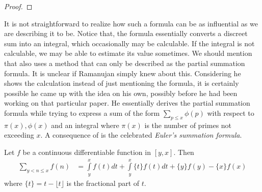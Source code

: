 \documentclass[elemannt.tex]{subfile}
\begin{document}
		\begin{proof}
			
		\end{proof}
	It is not straightforward to realize how such a formula can be as influential as we are describing it to be. Notice that, the formula essentially converts a discreet sum into an integral, which occasionally may be calculable. If the integral is not calculable, we may be able to estimate its value sometimes. We should mention that \textcite[Page $83$, $\S4$]{aiyangar_hardy_vennkatesvara_seshu_aiyar_p_wilson_1927} also uses a method that can only be described as the partial summation formula. It is unclear if Ramanujan simply knew about this. Considering he shows the calculation instead of just mentioning the formula, it is certainly possible he came up with the idea on his own, possibly before he had been working on that particular paper. He essentially derives the partial summation formula while trying to express a sum of the form $\sum_{p\leq x}\phi(p)$ with respect to $\pi(x),\phi(x)$ and an integral where $\pi(x)$ is the number of primes not exceeding $x$. A consequence of  is the celebrated \textit{Euler's summation formula}.
		\begin{theorem}\label{thm:eulersum}
			Let $f$ be a continuous differentiable function in $[y,x]$. Then
				\begin{align*}
					\sum_{y<n\leq x}f(n)
						& = \int\limits_{y}^{x}f(t)dt+\int\limits_{y}^{x}\{t\}f(t)dt+\{y\}f(y)-\{x\}f(x)
				\end{align*}
			where $\{t\}=t-\lfloor{t}\rfloor$ is the fractional part of $t$.
		\end{theorem}
	
\end{document}
